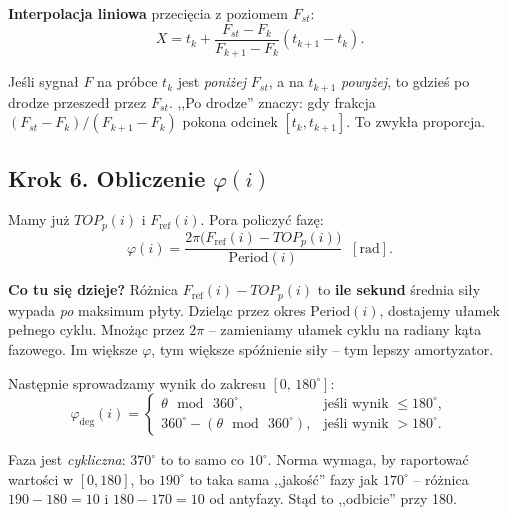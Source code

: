 \documentclass[11pt,a4paper]{article}
\theoremstyle{plainpol}
\begin{document}
\textbf{Interpolacja liniowa} przecięcia z poziomem $F_{st}$:
\begin{equation}
  X = t_k + \dfrac{F_{st} - F_k}{F_{k+1} - F_k}(t_{k+1} - t_k).
\end{equation}

\begin{intuicja}
Jeśli sygnał $F$ na próbce $t_k$ jest \emph{poniżej} $F_{st}$, a na
$t_{k+1}$ \emph{powyżej}, to gdzieś po drodze przeszedł przez $F_{st}$.
,,Po drodze'' znaczy: gdy frakcja $(F_{st} - F_k)/(F_{k+1} - F_k)$ pokona
odcinek $[t_k, t_{k+1}]$. To zwykła proporcja.
\end{intuicja}

\subsection{Krok 6. Obliczenie $\varphi(i)$}

Mamy już $TOP_p(i)$ i $F_{\mathrm{ref}}(i)$. Pora policzyć fazę:
\begin{equation}
  \boxed{\varphi(i) = \dfrac{2\pi\bigl(F_{\mathrm{ref}}(i) - TOP_p(i)\bigr)}{\mathrm{Period}(i)}\;\;[\mathrm{rad}].}
  \label{eq:phi_i}
\end{equation}

\begin{intuicja}
\textbf{Co tu się dzieje?} Różnica $F_{\mathrm{ref}}(i) - TOP_p(i)$ to
\textbf{ile sekund} średnia siły wypada \emph{po} maksimum płyty.
Dzieląc przez okres $\mathrm{Period}(i)$, dostajemy ułamek pełnego
cyklu. Mnożąc przez $2\pi$ -- zamieniamy ułamek cyklu na radiany kąta
fazowego. Im większe $\varphi$, tym większe spóźnienie siły -- tym
lepszy amortyzator.
\end{intuicja}

Następnie sprowadzamy wynik do zakresu $[0,\,180^\circ]$:
\begin{equation}
  \varphi_{\deg}(i) = \begin{cases}
    \theta \,\bmod\, 360^\circ, & \text{jeśli wynik } \leq 180^\circ, \\
    360^\circ - (\theta \,\bmod\, 360^\circ), & \text{jeśli wynik } > 180^\circ.
  \end{cases}
\end{equation}

\begin{intuicja}
Faza jest \emph{cykliczna}: $370^\circ$ to to samo co $10^\circ$.
Norma wymaga, by raportować wartości w $[0, 180]$, bo $190^\circ$
to taka sama ,,jakość'' fazy jak $170^\circ$ -- różnica $190 - 180 = 10$
i $180 - 170 = 10$ od antyfazy. Stąd to ,,odbicie'' przy 180.
\end{intuicja}
\end{document}
